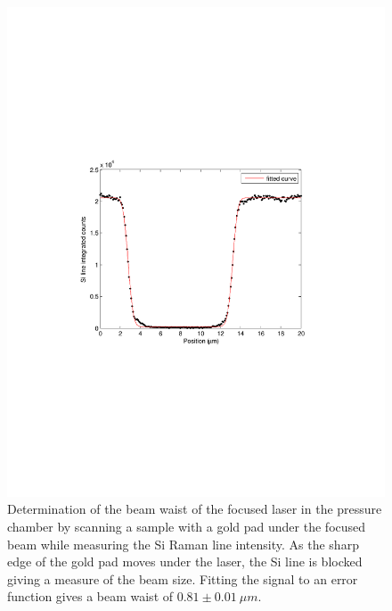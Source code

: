 \begin{figure}
	\begin{center}
	\includegraphics[scale=1]{Figs_Friction/SpotSize.pdf}
	\end{center}
	\caption[Beam waste determination]{\label{fig:fri:waist}
	Determination of the beam waist of the focused laser in the pressure chamber by scanning a sample with a gold pad under the focused beam while measuring the Si Raman line intensity.
	As the sharp edge of the gold pad moves under the laser, the Si line is blocked giving a measure of the beam size.
	Fitting the signal to an error function gives a beam waist of $0.81 \pm 0.01 \ \mu m$.}
\end{figure}

